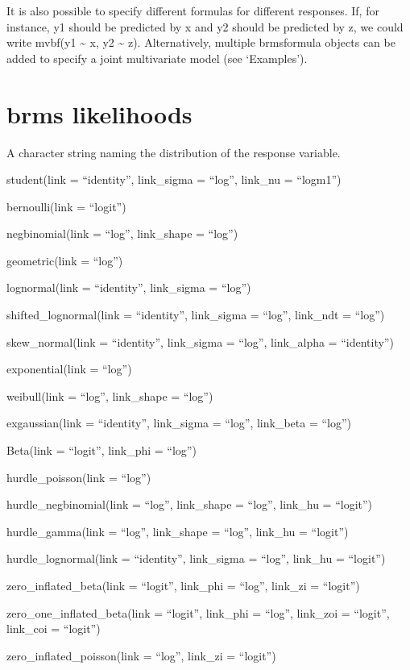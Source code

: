 \documentclass[]{book}
\begin{document}
It is also possible to specify different formulas for different responses. If, for instance, y1 should be predicted by x and y2 should be predicted by z, we could write mvbf(y1 \textasciitilde{} x, y2 \textasciitilde{} z). Alternatively, multiple brmsformula objects can be added to specify a joint multivariate model (see `Examples').

\hypertarget{brms-likelihoods}{%
\section{brms likelihoods}\label{brms-likelihoods}}

A character string naming the distribution of the response variable.

student(link = ``identity'', link\_sigma = ``log'', link\_nu = ``logm1'')

bernoulli(link = ``logit'')

negbinomial(link = ``log'', link\_shape = ``log'')

geometric(link = ``log'')

lognormal(link = ``identity'', link\_sigma = ``log'')

shifted\_lognormal(link = ``identity'', link\_sigma = ``log'',
link\_ndt = ``log'')

skew\_normal(link = ``identity'', link\_sigma = ``log'',
link\_alpha = ``identity'')

exponential(link = ``log'')

weibull(link = ``log'', link\_shape = ``log'')

exgaussian(link = ``identity'', link\_sigma = ``log'', link\_beta = ``log'')

Beta(link = ``logit'', link\_phi = ``log'')

hurdle\_poisson(link = ``log'')

hurdle\_negbinomial(link = ``log'', link\_shape = ``log'',
link\_hu = ``logit'')

hurdle\_gamma(link = ``log'', link\_shape = ``log'', link\_hu = ``logit'')

hurdle\_lognormal(link = ``identity'', link\_sigma = ``log'',
link\_hu = ``logit'')

zero\_inflated\_beta(link = ``logit'', link\_phi = ``log'',
link\_zi = ``logit'')

zero\_one\_inflated\_beta(link = ``logit'', link\_phi = ``log'',
link\_zoi = ``logit'', link\_coi = ``logit'')

zero\_inflated\_poisson(link = ``log'', link\_zi = ``logit'')
\end{document}
